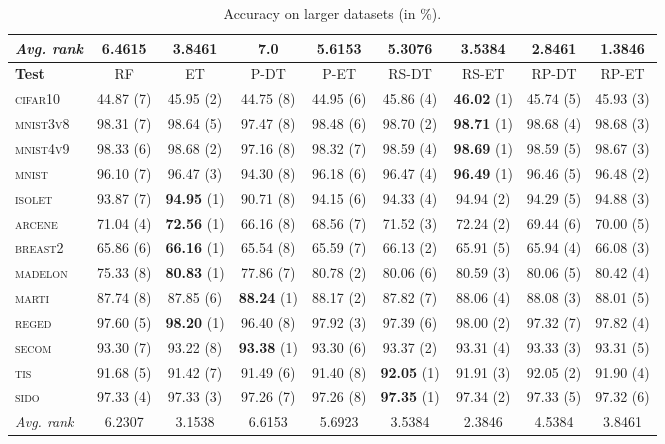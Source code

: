 \begin{table}
\begin{tabular}{|l|cccccccc|}
\hline
\textit{Avg. rank} & 6.4615 & 3.8461 & 7.0   & 5.6153 & 5.3076 & 3.5384 &  2.8461 & 1.3846 \\
\hline
\hline
\textbf{Test} & RF & ET & P-DT & P-ET & RS-DT & RS-ET & RP-DT & RP-ET \\
\hline
\hline
    \textsc{cifar10 }  &  44.87 (7)  &  45.95 (2)  &  44.75 (8)  &  44.95 (6)  &  45.86 (4)  &  \textbf{46.02} (1)  &  45.74 (5)  &  45.93 (3) \\
    \textsc{mnist3v8}  &  98.31 (7)  &  98.64 (5)  &  97.47 (8)  &  98.48 (6)  &  98.70 (2)  &  \textbf{98.71} (1)  &  98.68 (4)  &  98.68 (3) \\
    \textsc{mnist4v9}  &  98.33 (6)  &  98.68 (2)  &  97.16 (8)  &  98.32 (7)  &  98.59 (4)  &  \textbf{98.69} (1)  &  98.59 (5)  &  98.67 (3) \\
    \textsc{mnist   }  &  96.10 (7)  &  96.47 (3)  &  94.30 (8)  &  96.18 (6)  &  96.47 (4)  &  \textbf{96.49} (1)  &  96.46 (5)  &  96.48 (2) \\
    \textsc{isolet  }  &  93.87 (7)  &  \textbf{94.95} (1)  &  90.71 (8)  &  94.15 (6)  &  94.33 (4)  &  94.94 (2)  &  94.29 (5)  &  94.88 (3) \\
    \textsc{arcene  }  &  71.04 (4)  &  \textbf{72.56} (1)  &  66.16 (8)  &  68.56 (7)  &  71.52 (3)  &  72.24 (2)  &  69.44 (6)  &  70.00 (5) \\
    \textsc{breast2 }  &  65.86 (6)  &  \textbf{66.16} (1)  &  65.54 (8)  &  65.59 (7)  &  66.13 (2)  &  65.91 (5)  &  65.94 (4)  &  66.08 (3) \\
    \textsc{madelon }  &  75.33 (8)  &  \textbf{80.83} (1)  &  77.86 (7)  &  80.78 (2)  &  80.06 (6)  &  80.59 (3)  &  80.06 (5)  &  80.42 (4) \\
    \textsc{marti   }  &  87.74 (8)  &  87.85 (6)  &  \textbf{88.24} (1)  &  88.17 (2)  &  87.82 (7)  &  88.06 (4)  &  88.08 (3)  &  88.01 (5) \\
    \textsc{reged   }  &  97.60 (5)  &  \textbf{98.20} (1)  &  96.40 (8)  &  97.92 (3)  &  97.39 (6)  &  98.00 (2)  &  97.32 (7)  &  97.82 (4) \\
    \textsc{secom   }  &  93.30 (7)  &  93.22 (8)  &  \textbf{93.38} (1)  &  93.30 (6)  &  93.37 (2)  &  93.31 (4)  &  93.33 (3)  &  93.31 (5) \\
    \textsc{tis     }  &  91.68 (5)  &  91.42 (7)  &  91.49 (6)  &  91.40 (8)  &  \textbf{92.05} (1)  &  91.91 (3)  &  92.05 (2)  &  91.90 (4) \\
    \textsc{sido    }  &  97.33 (4)  &  97.33 (3)  &  97.26 (7)  &  97.26 (8)  &  \textbf{97.35} (1)  &  97.34 (2)  &  97.33 (5)  &  97.32 (6) \\
\hline
\textit{Avg. rank} & 6.2307 & 3.1538 & 6.6153 & 5.6923 & 3.5384 & 2.3846 & 4.5384 & 3.8461 \\
\hline
\end{tabular}
    \caption{Accuracy on larger datasets (in \%).}
    \label{table:rp:accuracy-large}
\end{table}

